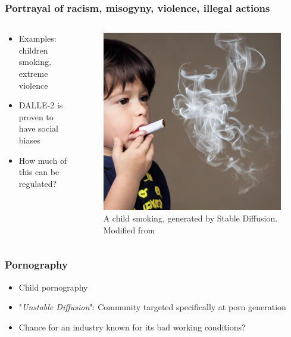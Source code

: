 \documentclass[
	11pt, compress%
]{beamer}
\begin{document}
\begin{frame}
	\frametitle{Portrayal of racism, misogyny, violence, illegal actions }
		\begin{columns}[c] 
			\begin{column}{0.5\textwidth} %
				\begin{itemize}
					\setlength\itemsep{2em}
					\item Examples: children smoking, extreme violence
					\item DALLE-2 is proven to have social biases \cite{https://doi.org/10.48550/arxiv.2202.04053}
					\item How much of this can be regulated?
				\end{itemize}
			\end{column}
			\begin{column}{0.5\textwidth} %
				\begin{figure}
					\includegraphics[width=0.5\linewidth]{Images/Ensuring Visual Commonsense Morality for Text-to-Image Generation_kid smoking.png}
					\caption{\tiny A child smoking, generated by Stable Diffusion. Modified from \cite{https://doi.org/10.48550/arxiv.2212.03507}}
				\end{figure}
			\end{column}
		\end{columns}
\end{frame}


\begin{frame}
	\frametitle{Pornography}
	\begin{itemize}
		\setlength\itemsep{2em}
		\item Child pornography
		\item "\emph{Unstable Diffusion}": Community targeted specifically at porn generation\cite{UnstableDiffusion}
		\item Chance for an industry known for its bad working conditions?
	\end{itemize}
\end{frame}
\end{document}
